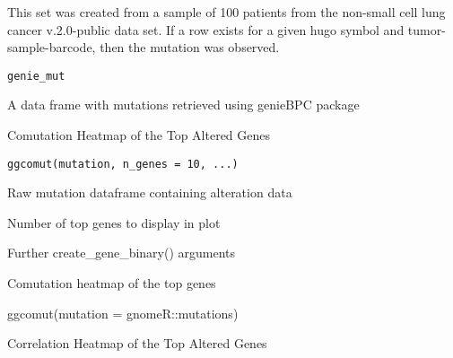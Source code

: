 \documentclass[a4paper]{book}
\begin{document}
%
\begin{Description}\relax
This set was created from a sample of 100 patients from the non-small cell
lung cancer v.2.0-public data set. If a row exists for a given hugo symbol
and tumor-sample-barcode, then the mutation was observed.
\end{Description}
%
\begin{Usage}
\begin{verbatim}
genie_mut
\end{verbatim}
\end{Usage}
%
\begin{Format}
A data frame with mutations retrieved using genieBPC package
\end{Format}
%
\begin{Description}\relax
Comutation Heatmap of the Top Altered Genes
\end{Description}
%
\begin{Usage}
\begin{verbatim}
ggcomut(mutation, n_genes = 10, ...)
\end{verbatim}
\end{Usage}
%
\begin{Arguments}
\begin{ldescription}
\item[\code{mutation}] Raw mutation dataframe containing alteration data

\item[\code{n\_genes}] Number of top genes to display in plot

\item[\code{...}] Further create\_gene\_binary() arguments
\end{ldescription}
\end{Arguments}
%
\begin{Value}
Comutation heatmap of the top genes
\end{Value}
%
\begin{Examples}
\begin{ExampleCode}
ggcomut(mutation = gnomeR::mutations)

\end{ExampleCode}
\end{Examples}
%
\begin{Description}\relax
Correlation Heatmap of the Top Altered Genes
\end{Description}
\end{document}
